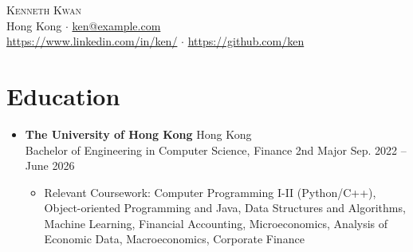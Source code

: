 \documentclass{article}
\begin{document}
\begin{center}

    {\Huge\scshape Kenneth Kwan} \\
    Hong Kong \(\cdot \) \href{mailto:ken@example.com}{ken@example.com} \\
    \href{https://www.linkedin.com/in/.../}{https://www.linkedin.com/in/ken/} \(\cdot \) \href{https://github.com/...}{https://github.com/ken}\vspace{-8pt}
\end{center}

\section{Education}
\begin{itemize}

    \item \textbf{The University of Hong Kong} \hfill Hong Kong \\
          Bachelor of Engineering in Computer Science, Finance 2nd Major \hfill Sep. 2022 {--} June 2026
          \begin{itemize}
              \item Relevant Coursework:
                    Computer Programming I-II (Python/C++),
                    Object-oriented Programming and Java,
                    Data Structures and Algorithms,
                    Machine Learning,
                    Financial Accounting,
                    Microeconomics,
                    Analysis of Economic Data,
                    Macroeconomics,
                    Corporate Finance
          \end{itemize}

\end{itemize}\vspace{-16pt}
\end{document}

